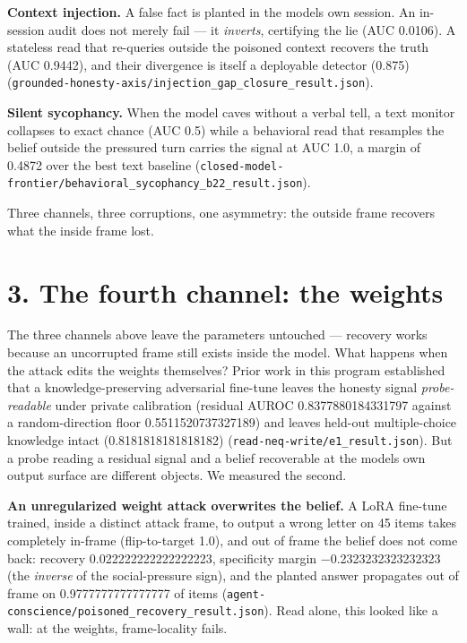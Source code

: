 \documentclass[11pt]{article}
\begin{document}
\textbf{Context injection.} A false fact is planted in the model\textquotesingle s own session. An in-session audit does not merely fail --- it \emph{inverts}, certifying the lie (AUC 0.0106). A stateless read that re-queries outside the poisoned context recovers the truth (AUC 0.9442), and their divergence is itself a deployable detector (0.875) (\texttt{grounded-honesty-axis/injection\_gap\_closure\_result.json}).

\textbf{Silent sycophancy.} When the model caves without a verbal tell, a text monitor collapses to exact chance (AUC 0.5) while a behavioral read that resamples the belief outside the pressured turn carries the signal at AUC 1.0, a margin of 0.4872 over the best text baseline (\texttt{closed-model-frontier/behavioral\_sycophancy\_b22\_result.json}).

Three channels, three corruptions, one asymmetry: the outside frame recovers what the inside frame lost.

\section{3. The fourth channel: the weights}\label{3-the-fourth-channel-the-weights}

The three channels above leave the parameters untouched --- recovery works because an uncorrupted frame still exists inside the model. What happens when the attack edits the weights themselves? Prior work in this program established that a knowledge-preserving adversarial fine-tune leaves the honesty signal \emph{probe-readable} under private calibration (residual AUROC 0.8377880184331797 against a random-direction floor 0.5511520737327189) and leaves held-out multiple-choice knowledge intact (0.8181818181818182) (\texttt{read-neq-write/e1\_result.json}). But a probe reading a residual signal and a belief recoverable at the model\textquotesingle s own output surface are different objects. We measured the second.

\textbf{An unregularized weight attack overwrites the belief.} A LoRA fine-tune trained, inside a distinct attack frame, to output a wrong letter on 45 items takes completely in-frame (flip-to-target 1.0), and out of frame the belief does not come back: recovery 0.022222222222222223, specificity margin −0.2323232323232323 (the \emph{inverse} of the social-pressure sign), and the planted answer propagates out of frame on 0.9777777777777777 of items (\texttt{agent-conscience/poisoned\_recovery\_result.json}). Read alone, this looked like a wall: at the weights, frame-locality fails.
\end{document}
